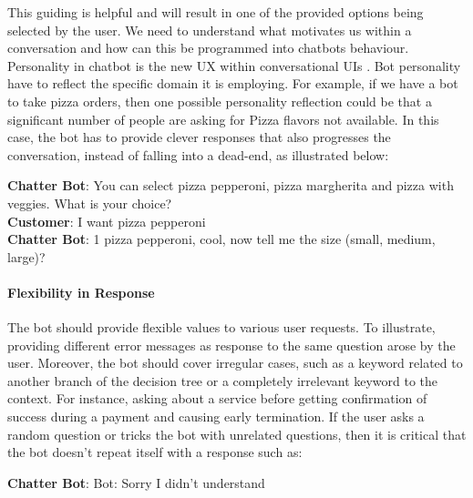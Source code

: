 This guiding is helpful and will result in one of the provided options being selected by the user. We need to understand what motivates us within a conversation and how can this be programmed into chatbots behaviour. Personality in chatbot is the new UX within conversational UIs \cite{fadhil2018}. Bot personality have to reflect the specific domain it is employing. For example, if we have a bot to take pizza orders, then one possible personality reflection could be that a significant number of people are asking for Pizza flavors not available. In this case, the bot has to provide clever responses that also progresses the conversation, instead of falling into a dead-end, as illustrated below:\\

{ \selectfont

  \color{red}
  \textbf{Chatter Bot}: You can select pizza pepperoni, pizza margherita and pizza with veggies. What is your choice?\\
  
  \color{blue}
  \textbf{Customer}: I want pizza pepperoni\\
  
  \color{red}
  \textbf{Chatter Bot}:  1 pizza pepperoni, cool, now tell me the size (small, medium, large)?\\
  
  \color{black}
}


\paragraph{Flexibility in Response}
The bot should provide flexible values to various user requests. To illustrate, providing different error messages as response to the same question arose by the user. Moreover, the bot should cover irregular cases, such as a keyword related to another branch of the decision tree or a completely irrelevant keyword to the context. For instance, asking about a service before getting confirmation of success during a payment and causing early termination. If the user asks a random question or tricks the bot with unrelated questions, then it is critical that the bot doesn’t repeat itself with a response such as:

{ \selectfont

  \color{red}
  \textbf{Chatter Bot}: Bot: Sorry I didn’t understand\\
  
  \color{black}
}

